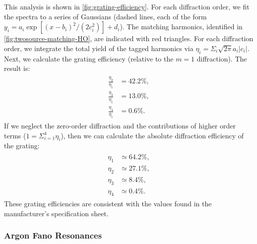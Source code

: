 This analysis is shown in \cref{fig:grating-efficiency}. For each diffraction order, we fit the spectra to a series of Gaussians (dashed lines, each of the form ${y_i = a_i \exp \left[ (x-b_i)^2 / (2 c_i^2) \right] + d_i}$). The matching harmonics, identified in \cref{fig:twosource-matching-HO}, are indicated with red triangles. For each diffraction order, we integrate the total yield of the tagged harmonics via ${\eta_i = \Sigma_i \sqrt{2 \pi} a_i |c_i|}$. Next, we calculate the grating efficiency (relative to the $m=1$ diffraction). The result is:
\begin{align}
\label{eqn:grating_efficiency}
\begin{split}
\frac{\eta_2}{\eta_1} &= 42.2 \%, \\
\frac{\eta_3}{\eta_1} &= 13.0 \%, \\
\frac{\eta_4}{\eta_1} &= 0.6 \%.
\end{split}
\end{align}
If we neglect the zero-order diffraction and the contributions of higher order terms (${1 = \Sigma_{i=1}^4 \eta_i}$), then we can calculate the absolute diffraction efficiency of the grating:
\begin{align}
\begin{split}
\eta_1 &\simeq  64.2 \%, \\
\eta_2 &\simeq 27.1 \%, \\
\eta_3 &\simeq 8.4 \%, \\
\eta_4 &\simeq 0.4 \%.
\end{split}
\end{align}
These grating efficiencies are consistent with the values found in the manufacturer's specification sheet.


\subsubsection{Argon Fano Resonances}

